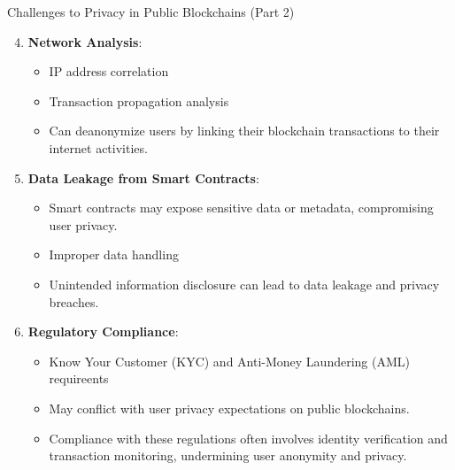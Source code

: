 \begin{frame}{Challenges to Privacy in Public Blockchains (Part 2)}
    \begin{enumerate}
        \setcounter{enumi}{3}
        \item \textbf{Network Analysis}:
            \begin{itemize}
                \item IP address correlation
                \item Transaction propagation analysis
                \item Can deanonymize users by linking their blockchain transactions to their internet activities.
            \end{itemize}
        
        \item \textbf{Data Leakage from Smart Contracts}:
            \begin{itemize}
                \item Smart contracts may expose sensitive data or metadata, compromising user privacy.
                \item Improper data handling
                \item Unintended information disclosure can lead to data leakage and privacy breaches.
            \end{itemize}
        
        \item \textbf{Regulatory Compliance}:
            \begin{itemize}
                \item Know Your Customer (KYC) and Anti-Money Laundering (AML) requireents
                \item May conflict with user privacy expectations on public blockchains.
                \item Compliance with these regulations often involves identity verification and transaction monitoring, undermining user anonymity and privacy.
            \end{itemize}
    \end{enumerate}
\end{frame}

